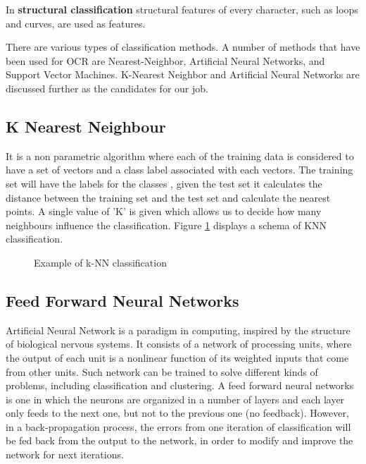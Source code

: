\documentclass[9pt,twocolumn,twoside]{../../styles/osajnl}
\begin{document}
In \textbf{structural classification} structural features of every
character, such as loops and curves, are used as features.

There are various types of classification methods. A number of methods that
have been used for OCR are Nearest-Neighbor, Artificial Neural Networks,
and Support Vector Machines. K-Nearest Neighbor and Artificial Neural Networks
are discussed further as the candidates for our job.

\subsection {K Nearest Neighbour}
It is a non parametric algorithm where each of the training data is considered to have a set of vectors and a class label associated with each vectors. The training set will have the labels for the classes , given the test set it calculates the distance between the training set and the test set and calculate the nearest points. A single value of 'K' is given which allows us to decide how many neighbours influence the classification. Figure \ref{fig:knn} displays a schema of KNN classification.

\begin{figure}
\centering
{}
\caption{Example of k-NN classification \cite{steinbach-book}}
\label{fig:knn}
\end{figure}

\subsection{Feed Forward Neural Networks}
Artificial Neural Network is a paradigm in computing, inspired by the
structure of biological nervous systems. It consists of a network of
processing units, where the output of each unit is a nonlinear
function of its weighted inputs that come from other units. Such
network can be trained to solve different kinds of problems, including
classification and clustering. A feed forward neural networks is one
in which the neurons are organized in a number of layers and each
layer only feeds to the next one, but not to the previous one (no
feedback). However, in a back-propagation process, the errors from one
iteration of classification will be fed back from the output to the
network, in order to modify and improve the network for next
iterations.
\end{document}
